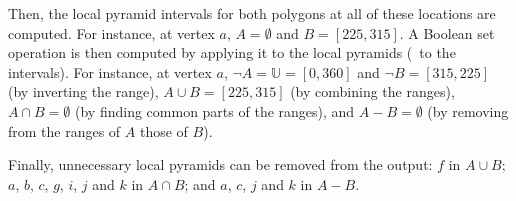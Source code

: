 Then, the local pyramid intervals for both polygons at all of these locations are computed.
For instance, at vertex \(a\), \(A = \emptyset{}\) and \(B = [225, 315]\).
A Boolean set operation is then computed by applying it to the local pyramids (\ie\ to the intervals).
For instance, at vertex \(a\), \(\neg A = \mathbb{U} = [0, 360]\) and \(\neg B = [315, 225]\) (by inverting the range), \(A \cup B = [225, 315]\) (by combining the ranges), \(A \cap B = \emptyset{}\) (by finding common parts of the ranges), and \(A - B = \emptyset{}\) (by removing from the ranges of \(A\) those of \(B\)).

Finally, unnecessary local pyramids can be removed from the output: \(f\) in \(A \cup B\); \(a\), \(b\), \(c\), \(g\), \(i\), \(j\) and \(k\) in \(A \cap B\); and \(a\), \(c\), \(j\) and \(k\) in \(A - B\).

